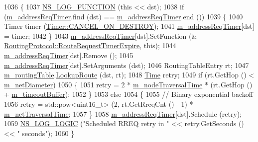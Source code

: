 \begin{DoxyCode}
1036 \{
1037   \hyperlink{log-macros-disabled_8h_a90b90d5bad1f39cb1b64923ea94c0761}{NS\_LOG\_FUNCTION} (\textcolor{keyword}{this} << dst);
1038   \textcolor{keywordflow}{if} (\hyperlink{classns3_1_1aodv_1_1RoutingProtocol_a3e21cac8acb05e13339eb0cabf13ddcf}{m\_addressReqTimer}.find (dst) == \hyperlink{classns3_1_1aodv_1_1RoutingProtocol_a3e21cac8acb05e13339eb0cabf13ddcf}{m\_addressReqTimer}.end ())
1039     \{
1040       Timer timer (\hyperlink{classns3_1_1Timer_a816309b83cd2a35bea47d9bbc6bbf721a07a9dd5063b32fb6cf1f813c6ee7e28e}{Timer::CANCEL\_ON\_DESTROY});
1041       \hyperlink{classns3_1_1aodv_1_1RoutingProtocol_a3e21cac8acb05e13339eb0cabf13ddcf}{m\_addressReqTimer}[dst] = timer;
1042     \}
1043   \hyperlink{classns3_1_1aodv_1_1RoutingProtocol_a3e21cac8acb05e13339eb0cabf13ddcf}{m\_addressReqTimer}[dst].SetFunction (&
      \hyperlink{classns3_1_1aodv_1_1RoutingProtocol_ae2ede2e919e00345ce1ba385c0527611}{RoutingProtocol::RouteRequestTimerExpire}, \textcolor{keyword}{this});
1044   \hyperlink{classns3_1_1aodv_1_1RoutingProtocol_a3e21cac8acb05e13339eb0cabf13ddcf}{m\_addressReqTimer}[dst].Remove ();
1045   \hyperlink{classns3_1_1aodv_1_1RoutingProtocol_a3e21cac8acb05e13339eb0cabf13ddcf}{m\_addressReqTimer}[dst].SetArguments (dst);
1046   RoutingTableEntry rt;
1047   \hyperlink{classns3_1_1aodv_1_1RoutingProtocol_a4e1003a34c8adc96db71096d88c98ae0}{m\_routingTable}.\hyperlink{classns3_1_1aodv_1_1RoutingTable_a90cbc8a2c65cd68ccdaf768fcbb5d723}{LookupRoute} (dst, rt);
1048   \hyperlink{namespacens3_1_1TracedValueCallback_a7ffd3e7c142ffe7c8a1d2db9b8de38ec}{Time} retry;
1049   \textcolor{keywordflow}{if} (rt.GetHop () < \hyperlink{classns3_1_1aodv_1_1RoutingProtocol_a563c2234b89a44628f8e71b38e7c60ec}{m\_netDiameter})
1050     \{
1051       retry = 2 * \hyperlink{classns3_1_1aodv_1_1RoutingProtocol_ad467863779ea1559ad5942ff6c24a706}{m\_nodeTraversalTime} * (rt.GetHop () + 
      \hyperlink{classns3_1_1aodv_1_1RoutingProtocol_a7805d2b1f8e48f3609f8770255a71e47}{m\_timeoutBuffer});
1052     \}
1053   \textcolor{keywordflow}{else}
1054     \{
1055       \textcolor{comment}{// Binary exponential backoff}
1056       retry = std::pow<uint16\_t> (2, rt.GetRreqCnt () - 1) * \hyperlink{classns3_1_1aodv_1_1RoutingProtocol_a4642e67ba68a7ef40405f5773650ea1a}{m\_netTraversalTime};
1057     \}
1058   \hyperlink{classns3_1_1aodv_1_1RoutingProtocol_a3e21cac8acb05e13339eb0cabf13ddcf}{m\_addressReqTimer}[dst].Schedule (retry);
1059   \hyperlink{group__logging_ga88acd260151caf2db9c0fc84997f45ce}{NS\_LOG\_LOGIC} (\textcolor{stringliteral}{"Scheduled RREQ retry in "} << retry.GetSeconds () << \textcolor{stringliteral}{" seconds"});
1060 \}
\end{DoxyCode}


